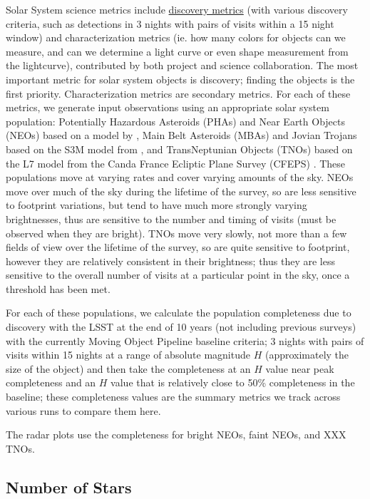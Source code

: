 Solar System science metrics include \href{https://github.com/lsst/sims_maf/blob/master/python/lsst/sims/maf/metrics/moMetrics.py#L215}{discovery metrics} (with various discovery criteria, such as detections in 3 nights with pairs of visits within a 15 night window) and characterization metrics (ie. how many colors for objects can we measure, and can we determine a light curve or even shape measurement from the lightcurve), contributed by both project and science collaboration. The most important metric for solar system objects is discovery; finding the objects is the first priority. Characterization metrics are secondary metrics. For each of these metrics, we generate input observations using an appropriate solar system population: Potentially Hazardous Asteroids (PHAs) and Near Earth Objects (NEOs) based on a model by \citet{2018Icar..312..181G}, Main Belt Asteroids (MBAs) and Jovian Trojans based on the S3M model from \citet{2011PASP..123..423G}, and TransNeptunian Objects (TNOs) based on the L7 model from the Canda France Ecliptic Plane Survey (CFEPS) \citep{2009AJ....137.4917K, 2011AJ....142..131P}. These populations move at varying rates and cover varying amounts of the sky. NEOs move over much of the sky during the lifetime of the survey, so are less sensitive to footprint variations, but tend to have much more strongly varying brightnesses, thus are sensitive to the number and timing of visits (must be observed when they are bright). TNOs move very slowly, not more than a few fields of view over the lifetime of the survey, so are quite sensitive to footprint, however they are relatively consistent in their brightness; thus they are less sensitive to the overall number of visits at a particular point in the sky, once a threshold has been met. 

For each of these populations, we calculate the population completeness due to discovery with the LSST at the end of 10 years (not including previous surveys) with the currently Moving Object Pipeline baseline criteria; 3 nights with pairs of visits within 15 nights at a range of absolute magnitude $H$ (approximately the size of the object) and then take the completeness at an $H$ value near peak completeness and an $H$ value that is relatively close to 50\% completeness in the baseline; these completeness values are the summary metrics we track across various runs to compare them here. 

The radar plots use the completeness for bright NEOs, faint NEOs, and XXX TNOs. 

\subsection{Number of Stars}

